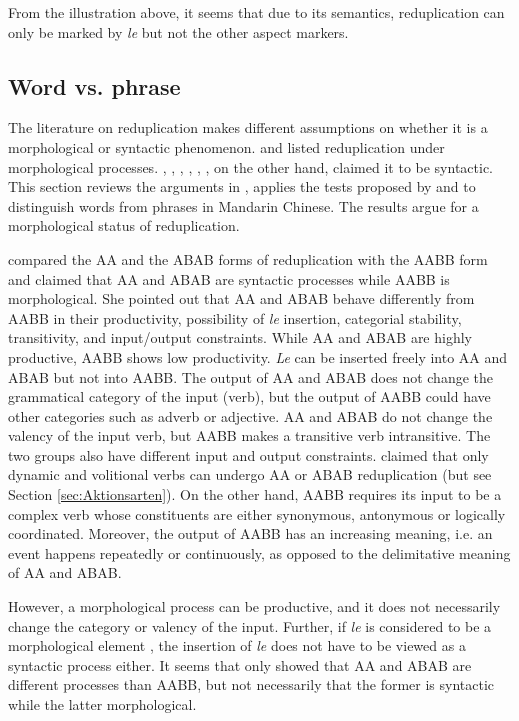\documentclass[11pt,a4paper,fleqn,draft]{article}
\begin{document}
From the illustration above, it seems that due to its semantics, reduplication can only be marked by \emph{le} but not the other aspect markers.







\subsection{Word vs. phrase}\label{sec:word}

The literature on reduplication makes different assumptions on whether it is a morphological or syntactic phenomenon.
\citet{Chao1968} and \citet{LiThompson1981} listed reduplication under morphological processes. 
\citet{Arcodiaetal2014}, \citet{BascianoMelloni2017}, \citet{MelloniBasciano2018}, \citet{Xie2020}, \citet{Xiong2016}, \citet{YangWei2017}, on the other hand, claimed it to be syntactic.
This section reviews the arguments in \citet{Xie2020}, applies the tests proposed by \citet{Duanmu1998} and \citet{Schaefer2009} to distinguish words from phrases in Mandarin Chinese. 
The results argue for a morphological status of reduplication.


\citet{Xie2020} compared the AA and the ABAB forms of reduplication with the AABB form and claimed that AA and ABAB are syntactic processes while AABB is morphological.
She pointed out that AA and ABAB behave differently from AABB in their productivity, possibility of \emph{le} insertion, categorial stability, transitivity, and input/output constraints.
While AA and ABAB are highly productive, AABB shows low productivity. 
\emph{Le} can be inserted freely into AA and ABAB but not into AABB.
The output of AA and ABAB does not change the grammatical category of the input (verb), but the output of AABB could have other categories such as adverb or adjective.
AA and ABAB do not change the valency of the input verb, but AABB makes a transitive verb intransitive. 
The two groups also have different input and output constraints. 
\citet{Xie2020} claimed that only dynamic and volitional verbs can undergo AA or ABAB reduplication (but see Section \ref{sec:Aktionsarten}).
On the other hand, AABB requires its input to be a complex verb whose constituents are either synonymous, antonymous or logically coordinated. 
Moreover, the output of AABB has an increasing meaning, i.e. an event happens repeatedly or continuously, as opposed to the delimitative meaning of AA and ABAB.

However, a morphological process can be productive, and it does not necessarily change the category or valency of the input.
Further, if \emph{le} is considered to be a morphological element \citep[e.g.][]{Huangetal2009, MuellerLipenkova2013}, the insertion of \emph{le} does not have to be viewed as a syntactic
process either.
It seems that \citet{Xie2020} only showed that AA and ABAB are different processes than AABB, but not necessarily that the former is syntactic while the latter morphological.
\end{document}
